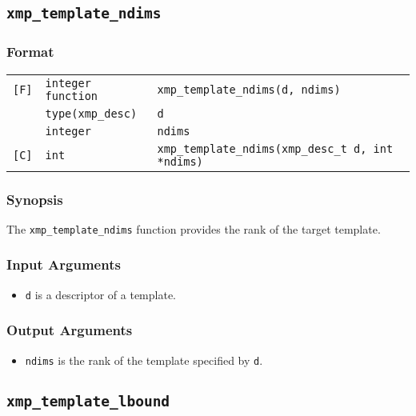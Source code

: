 \subsection{\tt xmp\_template\_ndims}

\subsubsection*{Format}

\begin{tabular}{lll}

\verb![F]!& {\tt integer function}& {\tt xmp\_template\_ndims(d, ndims)}\\
          & {\tt type(xmp\_desc)} & {\tt d}\\
          & {\tt integer} & {\tt ndims}\\

\verb![C]!&  {\tt int}& {\tt xmp\_template\_ndims(xmp\_desc\_t d, int *ndims)}\\

\end{tabular}

\subsubsection*{Synopsis}

The {\tt xmp\_template\_ndims} function provides the rank of the target
template.


\subsubsection*{Input Arguments}
\begin{itemize}
 \item {\tt d} is a descriptor of a template.
\end{itemize}

\subsubsection*{Output Arguments}
\begin{itemize}
 \item {\tt ndims} is the rank of the template specified by {\tt d}.
\end{itemize}


\subsection{\tt xmp\_template\_lbound}

